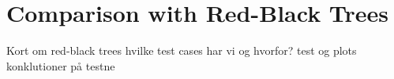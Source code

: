 \section*{Comparison with Red-Black Trees}
Kort om red-black trees
hvilke test cases har vi og hvorfor?
test og plots
konklutioner på testne